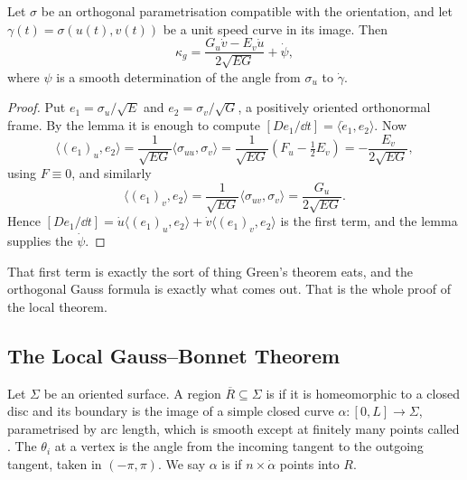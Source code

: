 \documentclass[a4paper]{scrartcl}
\begin{document}
\begin{proposition}
    Let $\sigma$ be an orthogonal parametrisation compatible with the orientation, and let $\gamma(t) = \sigma(u(t),v(t))$ be a unit speed curve in its image. Then
    $$
    \kappa_g = \frac{G_u \dot v - E_v \dot u}{2\sqrt{EG}} + \dot\psi,
    $$
    where $\psi$ is a smooth determination of the angle from $\sigma_u$ to $\dot\gamma$.
\end{proposition}
\begin{proof}
    Put $e_1 = \sigma_u/\sqrt E$ and $e_2 = \sigma_v/\sqrt G$, a positively oriented orthonormal frame. By the lemma it is enough to compute $[De_1/\dd t] = \langle \dot e_1, e_2\rangle$. Now
    $$
    \langle (e_1)_u, e_2\rangle = \frac{1}{\sqrt{EG}}\langle \sigma_{uu},\sigma_v\rangle = \frac{1}{\sqrt{EG}}\left(F_u - \tfrac12 E_v\right) = -\frac{E_v}{2\sqrt{EG}},
    $$
    using $F \equiv 0$, and similarly
    $$
    \langle (e_1)_v, e_2\rangle = \frac{1}{\sqrt{EG}}\langle\sigma_{uv},\sigma_v\rangle = \frac{G_u}{2\sqrt{EG}}.
    $$
    Hence $[De_1/\dd t] = \dot u\langle (e_1)_u,e_2\rangle + \dot v\langle (e_1)_v,e_2\rangle$ is the first term, and the lemma supplies the $\dot\psi$.
\end{proof}

That first term is exactly the sort of thing Green's theorem eats, and the orthogonal Gauss formula is exactly what comes out. That is the whole proof of the local theorem.

\subsection{The Local Gauss--Bonnet Theorem}

\begin{definition}
    Let $\Sigma$ be an oriented surface. A region $\overline R \subseteq \Sigma$ is  if it is homeomorphic to a closed disc and its boundary is the image of a simple closed curve $\alpha: [0,L] \rightarrow \Sigma$, parametrised by arc length, which is smooth except at finitely many points called . The  $\theta_i$ at a vertex is the angle from the incoming tangent to the outgoing tangent, taken in $(-\pi,\pi)$. We say $\alpha$ is  if $n \times \dot\alpha$ points into $R$.
\end{definition}
\end{document}
